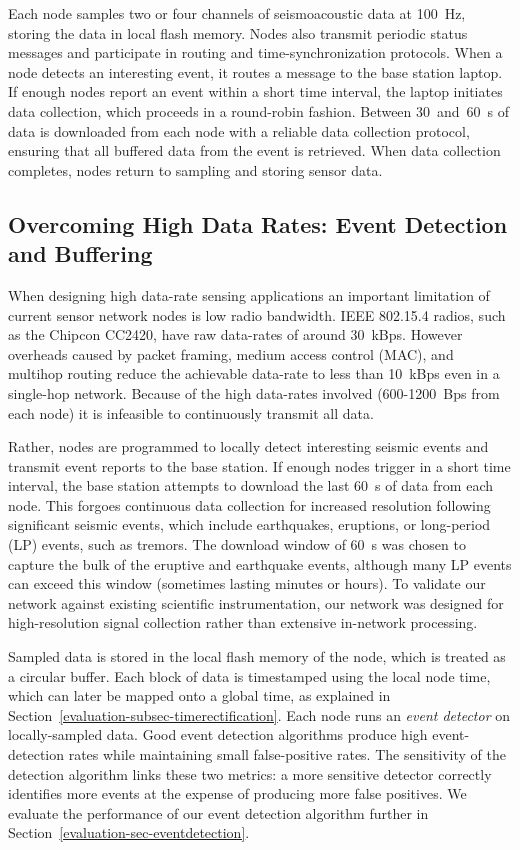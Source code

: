Each node samples two or four channels of seismoacoustic data at 100~Hz,
storing the data in local flash memory. Nodes also transmit periodic status
messages and participate in routing and time-synchronization protocols. When
a node detects an interesting event, it routes a message to the base station
laptop. If enough nodes report an event within a short time interval, the
laptop initiates data collection, which proceeds in a round-robin fashion.
Between 30~and~60~s of data is downloaded from each node with a reliable data
collection protocol, ensuring that all buffered data from the event is
retrieved. When data collection completes, nodes return to sampling and
storing sensor data.

\subsection{Overcoming High Data Rates: Event Detection and Buffering}

When designing high data-rate sensing applications an important limitation of
current sensor network nodes is low radio bandwidth. IEEE 802.15.4 radios,
such as the Chipcon CC2420, have raw data-rates of around 30~kBps. However
overheads caused by packet framing, medium access control (MAC), and multihop
routing reduce the achievable data-rate to less than 10~kBps even in a
single-hop network. Because of the high data-rates involved (600-1200~Bps
from each node) it is infeasible to continuously transmit all data.

Rather, nodes are programmed to locally detect interesting seismic events and
transmit event reports to the base station. If enough nodes trigger in a
short time interval, the base station attempts to download the last 60~s of
data from each node. This forgoes continuous data collection for increased
resolution following significant seismic events, which include earthquakes,
eruptions, or long-period (LP) events, such as tremors. The download window
of 60~s was chosen to capture the bulk of the eruptive and earthquake events,
although many LP events can exceed this window (sometimes lasting minutes or
hours). To validate our network against existing scientific instrumentation,
our network was designed for high-resolution signal collection rather than
extensive in-network processing.

Sampled data is stored in the local flash memory of the node, which is
treated as a circular buffer. Each block of data is timestamped using the
local node time, which can later be mapped onto a global time, as explained
in Section~\ref{evaluation-subsec-timerectification}. Each node runs an
\textit{event detector} on locally-sampled data. Good event detection
algorithms produce high event-detection rates while maintaining small
false-positive rates. The sensitivity of the detection algorithm links these
two metrics: a more sensitive detector correctly identifies more events at
the expense of producing more false positives. We evaluate the performance of
our event detection algorithm further in
Section~\ref{evaluation-sec-eventdetection}.

